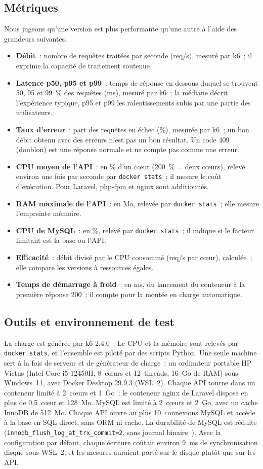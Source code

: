 \documentclass[conference,a4paper]{IEEEtran}
\begin{document}
\subsection{Métriques}
Nous jugeons qu'une version est plus performante qu'une autre à l'aide
des grandeurs suivantes.
\begin{itemize}
\item \textbf{Débit}~: nombre de requêtes traitées par seconde
(req/s), mesuré par k6~; il exprime la capacité de traitement
soutenue.
\item \textbf{Latence p50, p95 et p99}~: temps de réponse en
dessous duquel se trouvent 50, 95 et 99~\% des requêtes (ms), mesuré
par k6~; la médiane décrit l'expérience typique, p95 et p99 les
ralentissements subis par une partie des utilisateurs.
\item \textbf{Taux d'erreur}~: part des requêtes en échec (\%),
mesurée par k6~; un bon débit obtenu avec des erreurs n'est pas un bon
résultat. Un code 409 (doublon) est une réponse normale et ne compte
pas comme une erreur.
\item \textbf{CPU moyen de l'API}~: en \% d'un cœur (200~\% = deux
cœurs), relevé environ une fois par seconde par \texttt{docker stats}~;
il mesure le coût d'exécution. Pour Laravel, php-fpm et nginx sont
additionnés.
\item \textbf{RAM maximale de l'API}~: en Mo, relevée par
\texttt{docker stats}~; elle mesure l'empreinte mémoire.
\item \textbf{CPU de MySQL}~: en \%, relevé par \texttt{docker stats}~;
il indique si le facteur limitant est la base ou l'API.
\item \textbf{Efficacité}~: débit divisé par le CPU consommé
(req/s par cœur), calculée~; elle compare les versions à ressources
égales.
\item \textbf{Temps de démarrage à froid}~: en ms, du lancement du
conteneur à la première réponse 200~; il compte pour la montée en
charge automatique.
\end{itemize}

\subsection{Outils et environnement de test}
La charge est générée par k6 2.4.0~\cite{k6}. Le CPU et la mémoire sont
relevés par \texttt{docker stats}, et l'ensemble est piloté par des
scripts Python. Une seule machine sert à la fois de serveur et de
générateur de charge~: un ordinateur portable HP Victus (Intel Core
i5-12450H, 8~cœurs et 12~threads, 16~Go de RAM) sous Windows~11, avec
Docker Desktop 29.9.3 (WSL~2). Chaque API tourne dans un conteneur
limité à 2~cœurs et 1~Go~; le conteneur nginx de Laravel dispose en
plus de 0,5~cœur et 128~Mo. MySQL est limité à 2~cœurs et 2~Go, avec un
cache InnoDB de 512~Mo. Chaque API ouvre au plus 10~connexions MySQL et
accède à la base en SQL direct, sans ORM ni cache. La durabilité de
MySQL est réduite (\texttt{innodb\_flush\_log\_at\_trx\_commit=2}, sans
journal binaire~\cite{mysql}). Avec la configuration par défaut, chaque
écriture coûtait environ 9~ms de synchronisation disque sous WSL~2, et
les mesures auraient porté sur le disque plutôt que sur les API.
\end{document}

